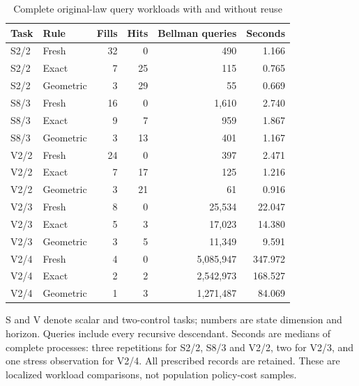 \begin{table}[htbp]
\centering
\caption{Complete original-law query workloads with and without reuse}\label{tab:reuse-summary72}
{\small\setlength{\tabcolsep}{4pt}
\begin{tabular}{llrrrr}
\hline
Task & Rule & Fills & Hits & Bellman queries & Seconds \\
\hline
S2/2 & Fresh & 32 & 0 & 490 & 1.166 \\
S2/2 & Exact & 7 & 25 & 115 & 0.765 \\
S2/2 & Geometric & 3 & 29 & 55 & 0.669 \\
S8/3 & Fresh & 16 & 0 & 1,610 & 2.740 \\
S8/3 & Exact & 9 & 7 & 959 & 1.867 \\
S8/3 & Geometric & 3 & 13 & 401 & 1.167 \\
V2/2 & Fresh & 24 & 0 & 397 & 2.471 \\
V2/2 & Exact & 7 & 17 & 125 & 1.216 \\
V2/2 & Geometric & 3 & 21 & 61 & 0.916 \\
V2/3 & Fresh & 8 & 0 & 25,534 & 22.047 \\
V2/3 & Exact & 5 & 3 & 17,023 & 14.380 \\
V2/3 & Geometric & 3 & 5 & 11,349 & 9.591 \\
V2/4 & Fresh & 4 & 0 & 5,085,947 & 347.972 \\
V2/4 & Exact & 2 & 2 & 2,542,973 & 168.527 \\
V2/4 & Geometric & 1 & 3 & 1,271,487 & 84.069 \\
\hline
\end{tabular}}
\par\smallskip
{\footnotesize S and V denote scalar and two-control tasks; numbers are state dimension and horizon. Queries include every recursive descendant. Seconds are medians of complete processes: three repetitions for S2/2, S8/3 and V2/2, two for V2/3, and one stress observation for V2/4. All prescribed records are retained. These are localized workload comparisons, not population policy-cost samples.}
\end{table}
